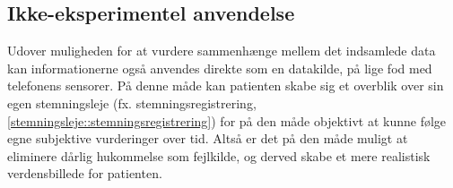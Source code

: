 \subsection{Ikke-eksperimentel anvendelse}
Udover muligheden for at vurdere sammenhænge mellem det indsamlede data kan informationerne også anvendes direkte som en datakilde, på lige fod med telefonens sensorer.
På denne måde kan patienten skabe sig et overblik over sin egen stemningsleje (fx. stemningsregistrering, \cref{stemningsleje::stemningsregistrering}) for på den måde objektivt at kunne følge egne subjektive vurderinger over tid.
Altså er det på den måde muligt at eliminere dårlig hukommelse som fejlkilde, og derved skabe et mere realistisk verdensbillede for patienten.
